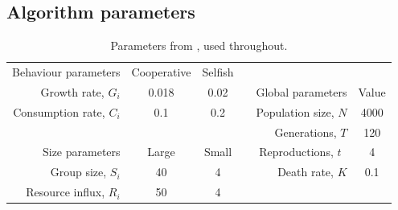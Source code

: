 \documentclass[11pt]{article}
\begin{document}
\newpage
\begin{appendices}
\section{Algorithm parameters}
\label{app:parameters}
\vspace{-.5cm}
\begin{table}[!ht]
  \centering
  \begin{tabular}{r|c|ccr|c}
  Behaviour parameters  & Cooperative & Selfish &  & \multicolumn{1}{c}{} & \\ \cline{1-3}
  Growth rate, $G_i$      & 0.018     & 0.02    &  & Global parameters  & Value\\ \cline{5-6}
  Consumption rate, $C_i$   & 0.1     & 0.2   &  & Population size, $N$ & 4000\\
  \multicolumn{1}{r}{} & \multicolumn{1}{c}{} & \multicolumn{1}{c}{} &  & Generations, $T$ & 120 \\
  Size parameters   & Large     & Small   &  & Reproductions, $t$~    & 4\\ \cline{1-3}
  Group size, $S_i$     & 40      & 4     &  & Death rate, $K$ & 0.1\\
  Resource influx, $R_i$    & 50      & 4     &  & \multicolumn{1}{c}{} & \\
  \end{tabular}
  \caption{Parameters from \cite{orig}, used throughout.}
  \label{table:param}
\end{table}


\end{appendices}
\end{document}
